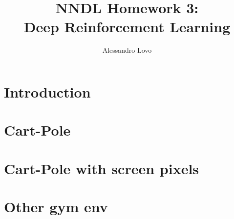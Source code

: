 \documentclass[a4paper, 11pt]{article}
\begin{document}
\title{NNDL Homework 3: \\ Deep Reinforcement Learning}
\author{Alessandro Lovo}
\maketitle

\section{Introduction}

\section{Cart-Pole}

\section{Cart-Pole with screen pixels}

\section{Other gym env}
\end{document}

